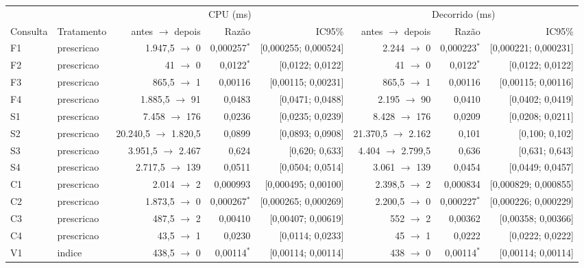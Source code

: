 {\footnotesize\setlength{\tabcolsep}{4pt}
\begin{tabular}{llrrrrrr}
\toprule
 &  & \multicolumn{3}{c}{CPU (ms)} & \multicolumn{3}{c}{Decorrido (ms)} \\
\cmidrule(lr){3-5}\cmidrule(lr){6-8}
Consulta & Tratamento & antes $\to$ depois & Razão & IC95\% & antes $\to$ depois & Razão & IC95\% \\
\midrule
F1 & prescricao & 1.947,5 $\to$ 0 & 0,000257$^{*}$ & [0,000255; 0,000524] & 2.244 $\to$ 0 & 0,000223$^{*}$ & [0,000221; 0,000231] \\
F2 & prescricao & 41 $\to$ 0 & 0,0122$^{*}$ & [0,0122; 0,0122] & 41 $\to$ 0 & 0,0122$^{*}$ & [0,0122; 0,0122] \\
F3 & prescricao & 865,5 $\to$ 1 & 0,00116 & [0,00115; 0,00231] & 865,5 $\to$ 1 & 0,00116 & [0,00115; 0,00116] \\
F4 & prescricao & 1.885,5 $\to$ 91 & 0,0483 & [0,0471; 0,0488] & 2.195 $\to$ 90 & 0,0410 & [0,0402; 0,0419] \\
S1 & prescricao & 7.458 $\to$ 176 & 0,0236 & [0,0235; 0,0239] & 8.428 $\to$ 176 & 0,0209 & [0,0208; 0,0211] \\
S2 & prescricao & 20.240,5 $\to$ 1.820,5 & 0,0899 & [0,0893; 0,0908] & 21.370,5 $\to$ 2.162 & 0,101 & [0,100; 0,102] \\
S3 & prescricao & 3.951,5 $\to$ 2.467 & 0,624 & [0,620; 0,633] & 4.404 $\to$ 2.799,5 & 0,636 & [0,631; 0,643] \\
S4 & prescricao & 2.717,5 $\to$ 139 & 0,0511 & [0,0504; 0,0514] & 3.061 $\to$ 139 & 0,0454 & [0,0449; 0,0457] \\
C1 & prescricao & 2.014 $\to$ 2 & 0,000993 & [0,000495; 0,00100] & 2.398,5 $\to$ 2 & 0,000834 & [0,000829; 0,000855] \\
C2 & prescricao & 1.873,5 $\to$ 0 & 0,000267$^{*}$ & [0,000265; 0,000269] & 2.200,5 $\to$ 0 & 0,000227$^{*}$ & [0,000226; 0,000229] \\
C3 & prescricao & 487,5 $\to$ 2 & 0,00410 & [0,00407; 0,00619] & 552 $\to$ 2 & 0,00362 & [0,00358; 0,00366] \\
C4 & prescricao & 43,5 $\to$ 1 & 0,0230 & [0,0114; 0,0233] & 45 $\to$ 1 & 0,0222 & [0,0222; 0,0222] \\
V1 & indice & 438,5 $\to$ 0 & 0,00114$^{*}$ & [0,00114; 0,00114] & 438 $\to$ 0 & 0,00114$^{*}$ & [0,00114; 0,00114] \\

\end{tabular}}
